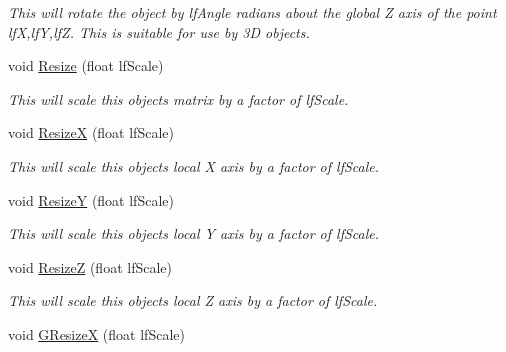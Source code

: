 \begin{DoxyCompactItemize}
\begin{DoxyCompactList}\small\item\em This will rotate the object by lfAngle radians about the global Z axis of the point lfX,lfY,lfZ. This is suitable for use by 3D objects. \end{DoxyCompactList}\item 
\hypertarget{classc_camera_matrix4_a620ba52edfd711f011d43a441eece9bc}{
void \hyperlink{classc_camera_matrix4_a620ba52edfd711f011d43a441eece9bc}{Resize} (float lfScale)}
\label{classc_camera_matrix4_a620ba52edfd711f011d43a441eece9bc}

\begin{DoxyCompactList}\small\item\em This will scale this objects matrix by a factor of lfScale. \end{DoxyCompactList}\item 
\hypertarget{classc_camera_matrix4_ab5ec9054a71a9df7bb671829875600f2}{
void \hyperlink{classc_camera_matrix4_ab5ec9054a71a9df7bb671829875600f2}{ResizeX} (float lfScale)}
\label{classc_camera_matrix4_ab5ec9054a71a9df7bb671829875600f2}

\begin{DoxyCompactList}\small\item\em This will scale this objects local X axis by a factor of lfScale. \end{DoxyCompactList}\item 
\hypertarget{classc_camera_matrix4_a44507dbaa203a79c420d9ceef985e186}{
void \hyperlink{classc_camera_matrix4_a44507dbaa203a79c420d9ceef985e186}{ResizeY} (float lfScale)}
\label{classc_camera_matrix4_a44507dbaa203a79c420d9ceef985e186}

\begin{DoxyCompactList}\small\item\em This will scale this objects local Y axis by a factor of lfScale. \end{DoxyCompactList}\item 
\hypertarget{classc_camera_matrix4_a6c4d89f66c5b6568b5f334c3ab4a7414}{
void \hyperlink{classc_camera_matrix4_a6c4d89f66c5b6568b5f334c3ab4a7414}{ResizeZ} (float lfScale)}
\label{classc_camera_matrix4_a6c4d89f66c5b6568b5f334c3ab4a7414}

\begin{DoxyCompactList}\small\item\em This will scale this objects local Z axis by a factor of lfScale. \end{DoxyCompactList}\item 
\hypertarget{classc_camera_matrix4_a9984a8427cd90e77a2fb6462ecf99ecc}{
void \hyperlink{classc_camera_matrix4_a9984a8427cd90e77a2fb6462ecf99ecc}{GResizeX} (float lfScale)}
\label{classc_camera_matrix4_a9984a8427cd90e77a2fb6462ecf99ecc}


\end{DoxyCompactItemize}
